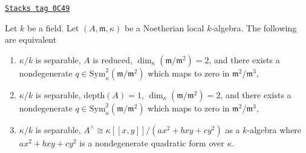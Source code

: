 \begin{lemma}
\label{curves-lemma-nodal-algebraic}
\href{https://stacks.math.columbia.edu/tag/0C49}{\texttt{Stacks tag 0C49}}

Let $k$ be a field. Let $(A, \mathfrak m, \kappa)$ be a Noetherian
local $k$-algebra. The following are equivalent
\begin{enumerate}
\item $\kappa/k$ is separable, $A$ is reduced,
$\dim_\kappa(\mathfrak m/\mathfrak m^2) = 2$, and there exists a nondegenerate
$q \in \text{Sym}^2_\kappa(\mathfrak m/\mathfrak m^2)$
which maps to zero in $\mathfrak m^2/\mathfrak m^3$,
\item $\kappa/k$ is separable, $\text{depth}(A) = 1$,
$\dim_\kappa(\mathfrak m/\mathfrak m^2) = 2$, and there exists a nondegenerate
$q \in \text{Sym}^2_\kappa(\mathfrak m/\mathfrak m^2)$
which maps to zero in $\mathfrak m^2/\mathfrak m^3$,
\item $\kappa/k$ is separable,
$A^\wedge \cong \kappa[[x, y]]/(ax^2 + bxy + cy^2)$
as a $k$-algebra where $ax^2 + bxy + cy^2$ is a nondegenerate quadratic form
over $\kappa$.
\end{enumerate}
\end{lemma}


